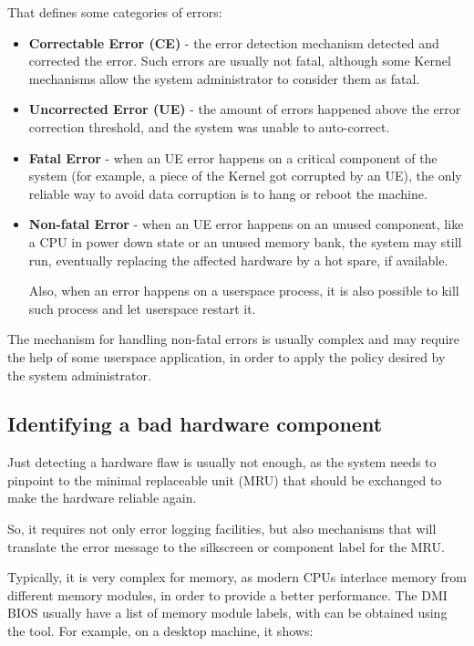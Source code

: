 \documentclass[a4paper,8pt,english]{sphinxmanual}
\begin{document}
That defines some categories of errors:
\begin{itemize}
\item {} 
\textbf{Correctable Error (CE)} - the error detection mechanism detected and
corrected the error. Such errors are usually not fatal, although some
Kernel mechanisms allow the system administrator to consider them as fatal.

\item {} 
\textbf{Uncorrected Error (UE)} - the amount of errors happened above the error
correction threshold, and the system was unable to auto-correct.

\item {} 
\textbf{Fatal Error} - when an UE error happens on a critical component of the
system (for example, a piece of the Kernel got corrupted by an UE), the
only reliable way to avoid data corruption is to hang or reboot the machine.

\item {} 
\textbf{Non-fatal Error} - when an UE error happens on an unused component,
like a CPU in power down state or an unused memory bank, the system may
still run, eventually replacing the affected hardware by a hot spare,
if available.

Also, when an error happens on a userspace process, it is also possible to
kill such process and let userspace restart it.

\end{itemize}

The mechanism for handling non-fatal errors is usually complex and may
require the help of some userspace application, in order to apply the
policy desired by the system administrator.


\subsection{Identifying a bad hardware component}
\label{admin-guide/ras:identifying-a-bad-hardware-component}
Just detecting a hardware flaw is usually not enough, as the system needs
to pinpoint to the minimal replaceable unit (MRU) that should be exchanged
to make the hardware reliable again.

So, it requires not only error logging facilities, but also mechanisms that
will translate the error message to the silkscreen or component label for
the MRU.

Typically, it is very complex for memory, as modern CPUs interlace memory
from different memory modules, in order to provide a better performance. The
DMI BIOS usually have a list of memory module labels, with can be obtained
using the  tool. For example, on a desktop machine, it shows:
\end{document}

